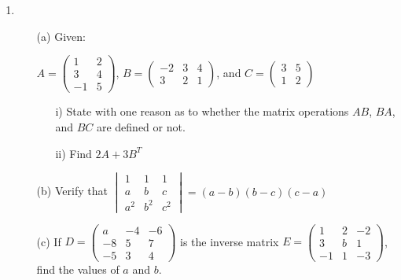 \begin{enumerate}
	\item 
	\begin{enumerate}[topsep=0ex,itemsep=0ex,partopsep=1ex,parsep=1ex]
		\item[(a)] Given:
		\begin{center}
		$A = \begin{pmatrix} 1 & 2 \\ 3 & 4 \\ -1 & 5 \end{pmatrix}$, $B = \begin{pmatrix} -2 & 3 & 4 \\ 3 & 2 & 1 \end{pmatrix}$, and $C = \begin{pmatrix} 3 & 5 \\ 1 & 2 \end{pmatrix}$
		\end{center}
		\begin{enumerate}[topsep=0ex,itemsep=0ex,partopsep=1ex,parsep=1ex]
			\item[i)] State with one reason as to whether the matrix operations $AB$, $BA$, and $BC$ are defined or not.
			\item[ii)] Find $2A + 3B^T$
		\end{enumerate}
		
		\item[(b)] Verify that $\begin{vmatrix} 1 & 1 & 1 \\ a & b & c \\ a^2 & b^2 & c^2 \end{vmatrix} = (a - b)(b - c)(c - a)$
		
		\item[(c)] If $D = \begin{pmatrix} a & -4 & -6 \\ -8 & 5 & 7 \\ -5 & 3 & 4 \end{pmatrix}$ is the inverse matrix $E = \begin{pmatrix} 1 & 2 & -2 \\ 3 & b & 1 \\ -1 & 1 & -3 \end{pmatrix}$, find the values of $a$ and $b$.
	\end{enumerate}

\end{enumerate}










